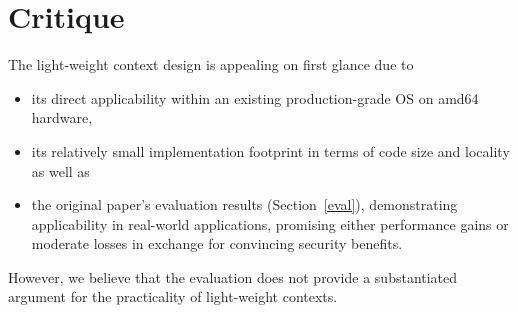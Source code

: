 \documentclass[10pt,twocolumn,a4paper]{article}
\begin{document}

\section{Critique}\label{eval:crit}
The light-weight context design is appealing on first glance due to
\begin{itemize}[nosep]
  \item its direct applicability within an existing production-grade OS on amd64 hardware,
  \item its relatively small implementation footprint in terms of code size and locality as well as
  \item the original paper's evaluation results (Section~\ref{eval}), demonstrating applicability in real-world applications, promising either performance gains or moderate losses in exchange for convincing security benefits.
\end{itemize}
However, we believe that the evaluation does not provide a substantiated argument for the practicality of light-weight contexts.
\end{document}
